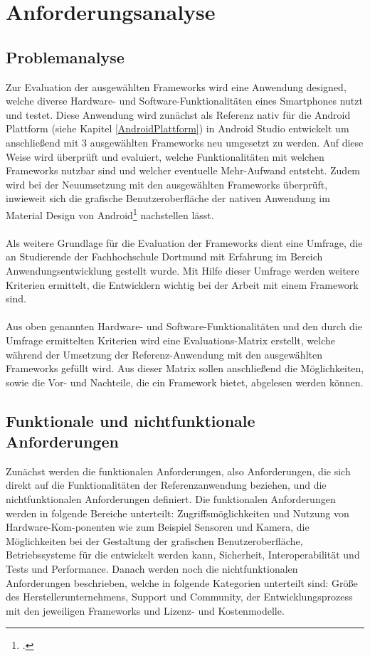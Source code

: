 \chapter{Anforderungsanalyse} \label{Anforderungsanalyse}


\section{Problemanalyse}

Zur Evaluation der ausgewählten Frameworks wird eine Anwendung designed, welche diverse Hardware- und Software-Funktionalitäten eines Smartphones nutzt und testet. Diese Anwendung wird zunächst als Referenz nativ für die Android Plattform (siehe Kapitel \ref{AndroidPlattform}) in Android Studio entwickelt um anschließend mit 3 ausgewählten Frameworks neu umgesetzt zu werden. Auf diese Weise wird überprüft und evaluiert, welche Funktionalitäten mit welchen Frameworks nutzbar sind und welcher eventuelle Mehr-Aufwand entsteht. Zudem wird bei der Neuumsetzung mit den ausgewählten Frameworks überprüft, inwieweit sich die grafische Benutzeroberfläche der nativen Anwendung im Material Design von Android\footcite{MaterialDesignHP} nachstellen lässt. 
\\
\\
Als weitere Grundlage für die Evaluation der Frameworks dient eine Umfrage, die an Studierende der Fachhochschule Dortmund mit Erfahrung im Bereich Anwendungsentwicklung gestellt wurde. Mit Hilfe dieser Umfrage werden weitere Kriterien ermittelt, die Entwicklern wichtig bei der Arbeit mit einem Framework sind.
\\
\\
Aus oben genannten Hardware- und Software-Funktionalitäten und den durch die Umfrage ermittelten Kriterien wird eine Evaluations-Matrix erstellt, welche während der Umsetzung der Referenz-Anwendung mit den ausgewählten Frameworks gefüllt wird. Aus dieser Matrix sollen anschließend die Möglichkeiten, sowie die Vor- und Nachteile, die ein Framework bietet, abgelesen werden können.

\section{Funktionale und nichtfunktionale Anforderungen}

Zunächst werden die funktionalen Anforderungen, also Anforderungen, die sich direkt auf die Funktionalitäten der Referenzanwendung beziehen, und die nichtfunktionalen Anforderungen definiert. Die funktionalen Anforderungen werden in folgende Bereiche unterteilt: Zugriffsmöglichkeiten und Nutzung von Hardware-Kom-ponenten wie zum Beispiel Sensoren und Kamera, die Möglichkeiten bei der Gestaltung der grafischen Benutzeroberfläche, Betriebssysteme für die entwickelt werden kann, Sicherheit, Interoperabilität und Tests und Performance. Danach werden noch die nichtfunktionalen Anforderungen beschrieben, welche in folgende Kategorien unterteilt sind: Größe des Herstellerunternehmens, Support und Community, der Entwicklungsprozess mit den jeweiligen Frameworks und Lizenz- und Kostenmodelle. 

